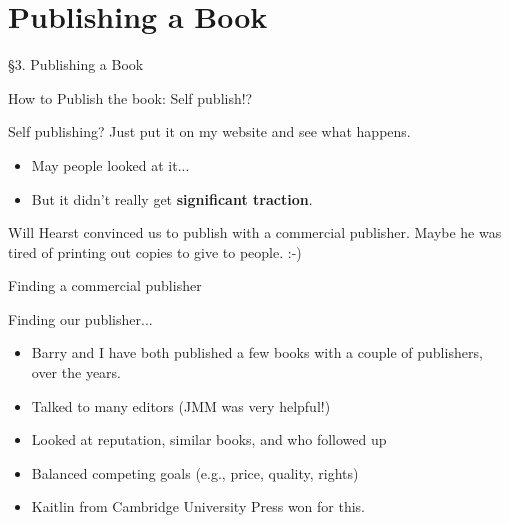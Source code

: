\documentclass{beamer}
\newcommand{\mysection}[2]{\section{#2}%
\begin{frame}{}
\vfill
\begin{center}
\hrulefill
\vfill
\Huge\sc \S#1. #2
\vfill
\hrulefill
\end{center}
\vfill
\end{frame}}
\begin{document}
\mysection{3}{Publishing a Book}

\begin{frame}{How to Publish the book:  Self publish!?}
\begin{block}{Self publishing?}
    Just put it on my website and see what happens.
          \begin{itemize}
            \item May people looked at it...
            \item But it didn't really get \textbf{significant traction}.
          \end{itemize}
          \end{block}
          \vfill
Will Hearst convinced us to publish with a commercial publisher.
Maybe he was tired of printing out copies to give to people. :-)
\end{frame}

\begin{frame}{Finding a commercial publisher}
\begin{block}{Finding our publisher...}
  \begin{itemize}
  \item Barry and I have both published a few books with a couple of publishers, over the years.
    \item Talked to many editors (JMM was very helpful!)
    \item Looked at reputation, similar books, and who followed up
    \item Balanced competing goals (e.g., price, quality, rights)
    \item Kaitlin from Cambridge University Press won for this.
  \end{itemize}
  \end{block}
\end{frame}
\end{document}
